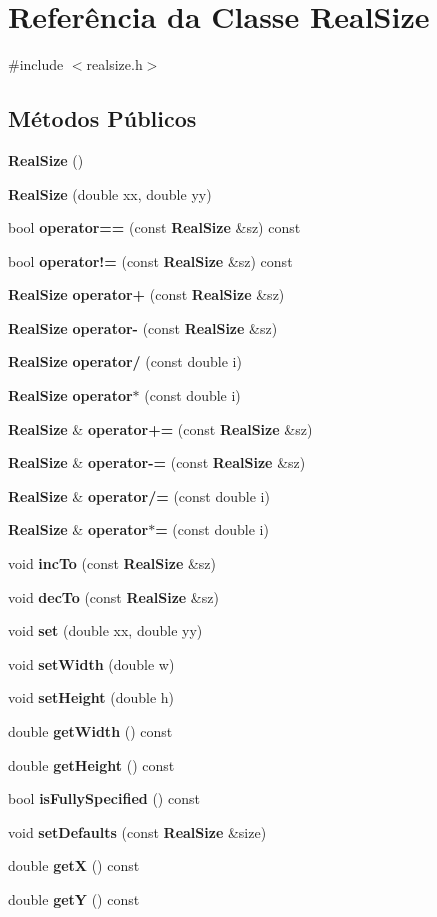 \section{Referência da Classe Real\+Size}
\label{class_real_size}


{\ttfamily \#include $<$realsize.\+h$>$}

\subsection*{Métodos Públicos}
\begin{DoxyCompactItemize}
\item 
{\bf Real\+Size} ()
\item 
{\bf Real\+Size} (double xx, double yy)
\item 
bool {\bf operator==} (const {\bf Real\+Size} \&sz) const 
\item 
bool {\bf operator!=} (const {\bf Real\+Size} \&sz) const 
\item 
{\bf Real\+Size} {\bf operator+} (const {\bf Real\+Size} \&sz)
\item 
{\bf Real\+Size} {\bf operator-\/} (const {\bf Real\+Size} \&sz)
\item 
{\bf Real\+Size} {\bf operator/} (const double i)
\item 
{\bf Real\+Size} {\bf operator$\ast$} (const double i)
\item 
{\bf Real\+Size} \& {\bf operator+=} (const {\bf Real\+Size} \&sz)
\item 
{\bf Real\+Size} \& {\bf operator-\/=} (const {\bf Real\+Size} \&sz)
\item 
{\bf Real\+Size} \& {\bf operator/=} (const double i)
\item 
{\bf Real\+Size} \& {\bf operator$\ast$=} (const double i)
\item 
void {\bf inc\+To} (const {\bf Real\+Size} \&sz)
\item 
void {\bf dec\+To} (const {\bf Real\+Size} \&sz)
\item 
void {\bf set} (double xx, double yy)
\item 
void {\bf set\+Width} (double w)
\item 
void {\bf set\+Height} (double h)
\item 
double {\bf get\+Width} () const 
\item 
double {\bf get\+Height} () const 
\item 
bool {\bf is\+Fully\+Specified} () const 
\item 
void {\bf set\+Defaults} (const {\bf Real\+Size} \&size)
\item 
double {\bf getX} () const 
\item 
double {\bf getY} () const 
\end{DoxyCompactItemize}
